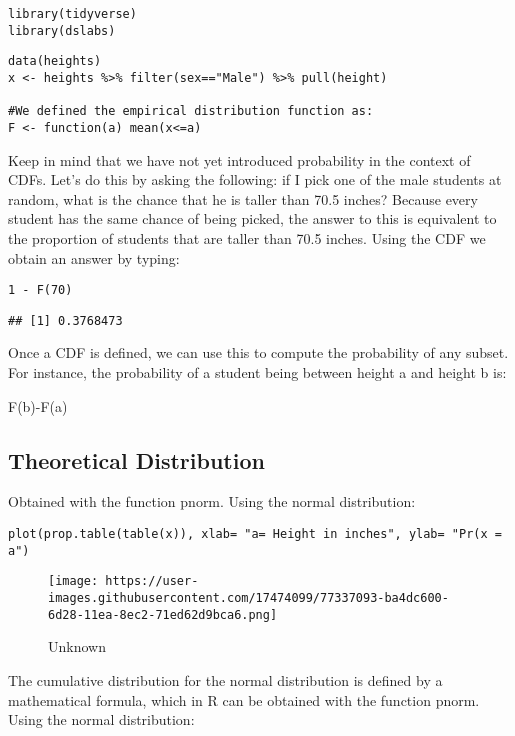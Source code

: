 \documentclass[
]{article}
\begin{document}
\begin{verbatim}
library(tidyverse)
library(dslabs)
\end{verbatim}

\begin{verbatim}
data(heights)
x <- heights %>% filter(sex=="Male") %>% pull(height)

#We defined the empirical distribution function as:
F <- function(a) mean(x<=a)
\end{verbatim}

Keep in mind that we have not yet introduced probability in the context
of CDFs. Let's do this by asking the following: if I pick one of the
male students at random, what is the chance that he is taller than 70.5
inches? Because every student has the same chance of being picked, the
answer to this is equivalent to the proportion of students that are
taller than 70.5 inches. Using the CDF we obtain an answer by typing:

\begin{verbatim}
1 - F(70)
\end{verbatim}

\begin{verbatim}
## [1] 0.3768473
\end{verbatim}

Once a CDF is defined, we can use this to compute the probability of any
subset. For instance, the probability of a student being between height
a and height b is:

F(b)-F(a)

\hypertarget{theoretical-distribution}{%
\subsection{Theoretical Distribution}\label{theoretical-distribution}}

Obtained with the function pnorm. Using the normal distribution:

\begin{verbatim}
plot(prop.table(table(x)), xlab= "a= Height in inches", ylab= "Pr(x = a")
\end{verbatim}

\begin{figure}
\centering
\texttt{[image: https://user-images.githubusercontent.com/17474099/77337093-ba4dc600-6d28-11ea-8ec2-71ed62d9bca6.png]}
\caption{Unknown}
\end{figure}

The cumulative distribution for the normal distribution is defined by a
mathematical formula, which in R can be obtained with the function
pnorm. Using the normal distribution:
\end{document}
